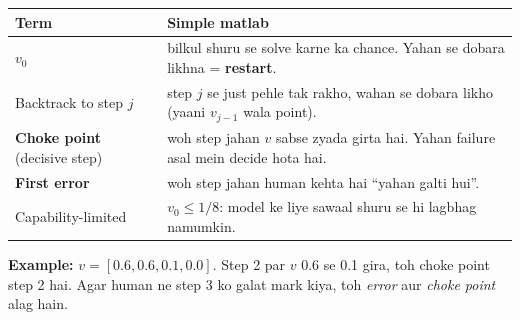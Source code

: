 \documentclass[10pt,a4paper]{article}
\begin{document}
\begin{center}\small
\begin{tabularx}{\textwidth}{lX}
\toprule
Term & Simple matlab \\
\midrule
$v_0$ & bilkul shuru se solve karne ka chance. Yahan se dobara likhna = \textbf{restart}. \\
Backtrack to step $j$ & step $j$ se just pehle tak rakho, wahan se dobara likho (yaani $v_{j-1}$ wala point). \\
\textbf{Choke point} (decisive step) & woh step jahan $v$ sabse zyada girta hai. Yahan failure asal mein decide hota hai. \\
\textbf{First error} & woh step jahan human kehta hai ``yahan galti hui''. \\
Capability-limited & $v_0 \le 1/8$: model ke liye sawaal shuru se hi lagbhag namumkin. \\
\bottomrule
\end{tabularx}
\end{center}
\textbf{Example:} $v = [0.6, 0.6, 0.1, 0.0]$. Step 2 par $v$ 0.6 se 0.1 gira, toh choke point step 2 hai.
Agar human ne step 3 ko galat mark kiya, toh \emph{error} aur \emph{choke point} alag hain.
\end{document}
